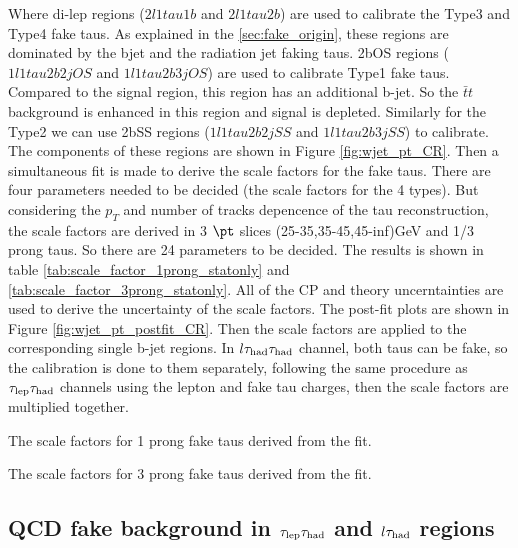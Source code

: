 Where di-lep regions ($2l1tau1b$ and $2l1tau2b$) are used to calibrate the Type3 and Type4 fake taus. As explained in the \ref{sec:fake_origin}, these regions are dominated by the bjet and the radiation jet faking taus. 2bOS regions ($1l1tau2b2j OS$ and $1l1tau2b3j OS$) are used to calibrate Type1 fake taus. Compared to the signal region, this region has an additional b-jet. So the $\bar{t}t$ background is enhanced in this region and signal is depleted. Similarly for the Type2 we can use 2bSS regions ($1l1tau2b2j SS$ and $1l1tau2b3j SS$) to calibrate. The components of these regions are shown in Figure \ref{fig:wjet_pt_CR}. Then a simultaneous fit is made to derive the scale factors for the fake taus. There are four parameters needed to be decided (the scale factors for the 4 types). But considering the $p_{T}$ and number of tracks depencence of the tau reconstruction, the scale factors are derived in 3 $\pt$ slices (25-35,35-45,45-inf)GeV and 1/3 prong taus. So there are 24 parameters to be decided. The results is shown in table \ref{tab:scale_factor_1prong_statonly} and \ref{tab:scale_factor_3prong_statonly}. All of the CP and theory uncerntainties are used to derive the uncertainty of the scale factors. The post-fit plots are shown in Figure \ref{fig:wjet_pt_postfit_CR}. Then the scale factors are applied to the corresponding single b-jet regions. In $l\tau_\text{had}{}\tau_\text{had}$ channel, both taus can be fake, so the calibration is done to them separately, following the same procedure as $\tau_\text{lep}{}\tau_\text{had}$ channels using the lepton and fake tau charges, then the scale factors are multiplied together.

\begin{table}
\caption{The scale factors for 1 prong fake taus derived from the fit.}
\label{tab:scale_factor_1prong_statonly}

\end{table}
\begin{table}
\caption{The scale factors for 3 prong fake taus derived from the fit.}
\label{tab:scale_factor_3prong_statonly}

\end{table}





\subsection{QCD fake background in $\tau_\text{lep}{}\tau_\text{had}$ and $l\tau_\text{had}$ regions}

